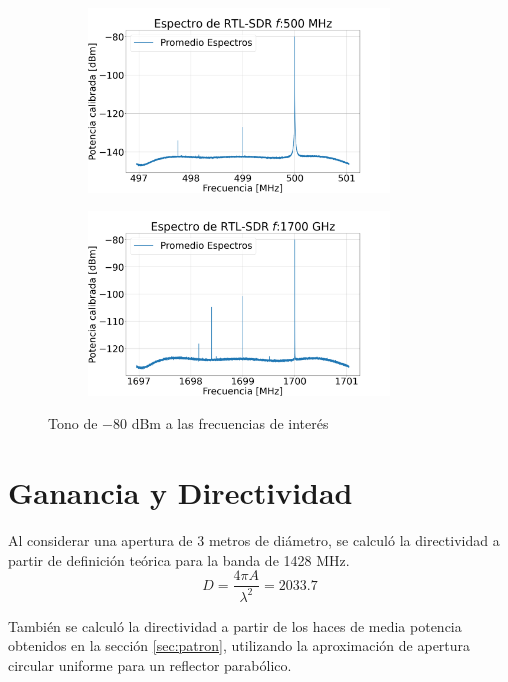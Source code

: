 \begin{figure}
\begin{subfigure}[b]{8cm}
    \end{subfigure}
    \hfill
    \begin{subfigure}[b]{8cm}
        \centering
        \includegraphics[width=8cm]{img/rtl500}
    \end{subfigure}
    \hfill
    \begin{subfigure}[b]{8cm}
        \centering
        \includegraphics[width=8cm]{img/rtl1700}
    \end{subfigure}
       \caption{Tono de $-80$ dBm a las frecuencias de interés}
       \label{fig:rtl_specs}
\end{figure}

\section{Ganancia y Directividad}

Al considerar una apertura de 3 metros de diámetro, se calculó la directividad a partir de definición teórica para la banda de 1428 MHz.\\

\begin{equation}
    D = \frac{4\pi A}{\lambda^2} = 2033.7
\end{equation}

También se calculó la directividad a partir de los haces de media potencia obtenidos en la sección \ref{sec:patron}, utilizando la aproximación de apertura circular uniforme para un reflector parabólico.\\


